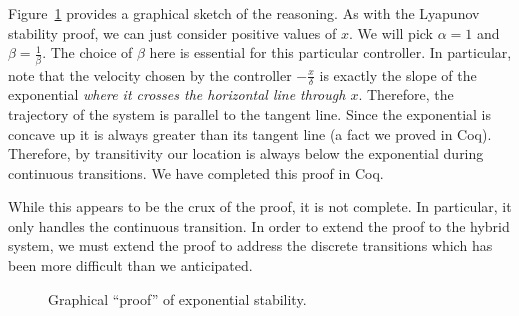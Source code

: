 \documentclass[preprint,nocopyrightspace]{sigplanconf}
\begin{document}
Figure~\ref{fig:graphical-proof} provides a graphical sketch of the reasoning.
As with the Lyapunov stability proof, we can just consider positive values of $x$.
We will pick $\alpha = 1$ and $\beta = \frac{1}{\beta}$.
The choice of $\beta$ here is essential for this particular controller.
In particular, note that the velocity chosen by the controller $-\frac{x}{\delta}$ is exactly the slope of the exponential \emph{where it crosses the horizontal line through $x$}.
Therefore, the trajectory of the system is parallel to the tangent line.
Since the exponential is concave up it is always greater than its tangent line (a fact we proved in Coq).
Therefore, by transitivity our location is always below the exponential during continuous transitions.
We have completed this proof in Coq.

While this appears to be the crux of the proof, it is not complete.
In particular, it only handles the continuous transition.
In order to extend the proof to the hybrid system, we must extend the proof to address the discrete transitions which has been more difficult than we anticipated.





\begin{figure}
\centering
{}

\caption{Graphical ``proof'' of exponential stability.}
\label{fig:graphical-proof}
\end{figure}
\end{document}
